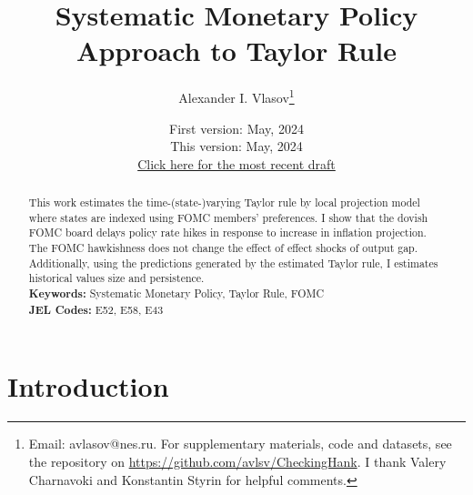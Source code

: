\documentclass[11pt]{article}
\title{Systematic Monetary Policy Approach to Taylor Rule}
\author{Alexander I. Vlasov\thanks{Email: avlasov@nes.ru. For supplementary materials, code and datasets, see the repository on \href{https://github.com/avlsv/CheckingHank}{https://github.com/avlsv/CheckingHank}. I thank Valery Charnavoki and Konstantin Styrin for helpful comments.}}
\date{\normalsize First version: May, 2024\\\vspace{1ex} This version: May, 2024\\ \vspace{1ex}
\href{https://github.com/alvlsv/CheckingHank/blob/main/Checking_HANK/Paper/CheckingHANK.pdf}{Click here for the most recent draft}}
\begin{document}
\maketitle



\begin{abstract}
    \noindent This work estimates the time-(state-)varying Taylor rule by local projection model where states are indexed using FOMC members' preferences. 
    I show that the dovish FOMC board delays policy rate hikes in response to increase in inflation projection. The FOMC hawkishness does not change the effect of effect shocks of output gap. 
    Additionally, using the predictions generated by the estimated Taylor rule, I estimates historical values size and persistence. 
    \\
    \noindent\textbf{Keywords:} Systematic Monetary Policy, Taylor Rule, FOMC
    \\
    \noindent\textbf{JEL Codes:} E52, E58, E43\\
    \bigskip
\end{abstract}

\section{Introduction}


\end{document}
